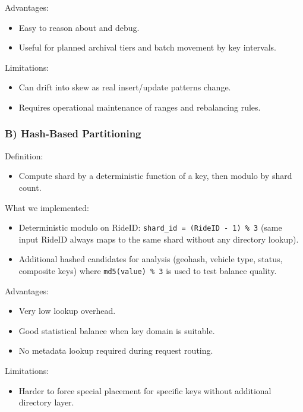 \documentclass[12pt]{article}
\begin{document}
Advantages:
\begin{itemize}
    \item Easy to reason about and debug.
    \item Useful for planned archival tiers and batch movement by key intervals.
\end{itemize}

Limitations:
\begin{itemize}
    \item Can drift into skew as real insert/update patterns change.
    \item Requires operational maintenance of ranges and rebalancing rules.
\end{itemize}

\subsubsection*{B) Hash-Based Partitioning}

Definition:
\begin{itemize}
    \item Compute shard by a deterministic function of a key, then modulo by shard count.
\end{itemize}

What we implemented:
\begin{itemize}
    \item Deterministic modulo on RideID: \texttt{shard\_id = (RideID - 1) \% 3} (same input RideID always maps to the same shard without any directory lookup).
    \item Additional hashed candidates for analysis (geohash, vehicle type, status, composite keys) where \texttt{md5(value) \% 3} is used to test balance quality.
\end{itemize}

Advantages:
\begin{itemize}
    \item Very low lookup overhead.
    \item Good statistical balance when key domain is suitable.
    \item No metadata lookup required during request routing.
\end{itemize}

Limitations:
\begin{itemize}
    \item Harder to force special placement for specific keys without additional directory layer.
\end{itemize}
\end{document}
